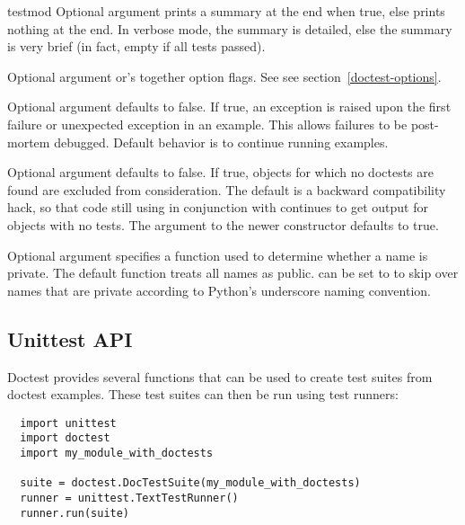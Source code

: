 \begin{funcdesc}{testmod}
  Optional argument  prints a summary at the end when true,
  else prints nothing at the end.  In verbose mode, the summary is
  detailed, else the summary is very brief (in fact, empty if all tests
  passed).

  Optional argument  or's together option flags.  See
  see section~\ref{doctest-options}.

  Optional argument  defaults to false.  If true,
  an exception is raised upon the first failure or unexpected exception
  in an example.  This allows failures to be post-mortem debugged.
  Default behavior is to continue running examples.

  Optional argument  defaults to false.  If true,
  objects for which no doctests are found are excluded from consideration.
  The default is a backward compatibility hack, so that code still
  using  in conjunction with
   continues to get output for objects with no tests.
  The  argument to the newer 
  constructor defaults to true.

  Optional argument  specifies a function used to
  determine whether a name is private.  The default function treats
  all names as public.   can be set to
   to skip over names that are
  private according to Python's underscore naming convention.


\end{funcdesc}

\subsection{Unittest API\label{doctest-unittest-api}}

Doctest provides several functions that can be used to create
 test suites from doctest examples.  These test
suites can then be run using  test runners:

\begin{verbatim}
  import unittest
  import doctest
  import my_module_with_doctests

  suite = doctest.DocTestSuite(my_module_with_doctests)
  runner = unittest.TextTestRunner()
  runner.run(suite)
\end{verbatim}


